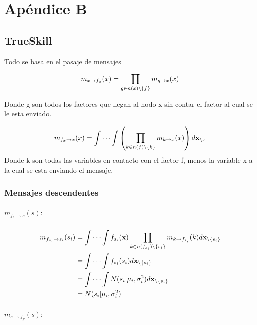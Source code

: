 \documentclass[11pt,twoside,spanish]{report} %
\begin{document}
\chapter{Ap\'endice B}
\section{TrueSkill}


Todo se basa en el pasaje de mensajes

\begin{equation}
	\centering
	m_{x\rightarrow f_{x}}(x) = \prod_{g\in n(x)\backslash\{f\}}m_{g\rightarrow x}(x)
\end{equation}

Donde g son todos los factores que llegan al nodo x sin contar el factor al cual se le esta enviado.

\begin{equation}
	\centering
	m_{f_{x}\rightarrow x}(x) = \int\cdots\int\left(\prod_{k\in n(f)\backslash\{k\}}m_{k\rightarrow x}(x)\right)d\textbf{x}_{\backslash x}
\end{equation}
Donde k son todas las variables en contacto con el factor f, menos la variable x a la cual se esta enviando el mensaje.

\subsection{Mensajes descendentes}
\label{appendix:mensajes}
\paragraph{$m_{f_{s}\rightarrow s}(s):$}

\begin{equation}
	\centering
	\begin{split}
		m_{f_{s_i}\rightarrow s_i}(s_i) & = \int\cdots\int f_{s_i}(\textbf{x})\prod_{k\in n(f_{s_i})\backslash\{s_i\}} m_{k\rightarrow f_{s_i}}(k)d\textbf{x}_{\backslash \{s_i\}} \\
		& = \int\cdots\int f_{s_i}(s_i)d\textbf{x}_{\backslash \{s_i\}} \\
		& = \int\cdots\int N(s_i \vert \mu_i,\sigma_i^2)d\textbf{x}_{\backslash \{s_i\}} \\
		& =  N(s_i \vert \mu_i,\sigma_i^2)
	\end{split}
\end{equation}

\paragraph{$m_{s\rightarrow f_{p}}(s):$}
\end{document}
